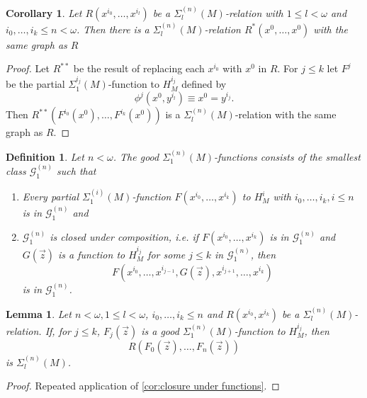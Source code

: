 \documentclass[12pt,a4paper]{article}
\theoremstyle{nicestyle}
\newtheorem{definition}{Definition}[subsection]
\newtheorem{lemma}{Lemma}[subsection]
\newtheorem{corollary}{Corollary}[subsection]
\begin{document}
\begin{corollary}
  Let $R(x^{i_{0}}, \ldots, x^{i_l})$ be a
  $\Sigma^{(n)}_l(M)$-relation with $1 \le l < \omega$ and
  $i_0, \ldots, i_k \le n < \omega$. Then there is a
  $\Sigma^{(n)}_l(M)$-relation $R^{*}(x^{0}, \ldots, x^0)$ with the
  same graph as $R$
\end{corollary}

\begin{proof}
  Let $R^{**}$ be the result of replacing each $x^{i_0}$ with $x^{0}$
  in $R$. For $j \le k$ let $F^j$ be the partial
  $\Sigma^{i_j}_1(M)$-function to $H^{i_j}_{M}$ defined by
  \[
    \phi^{j}(x^{0}, y^{i_{l}}) \equiv x^{0} = y^{i_{j}}.
  \]
  Then $R^{**}(F^{i_{0}}(x^{0}), \ldots, F^{i_{k}}(x^{0}))$ is a
  $\Sigma^{(n)}_l(M)$-relation with the same graph as $R$.
\end{proof}

\begin{definition}
  Let $n < \omega$.  The \emph{good $\Sigma^{(n)}_1(M)$-functions}
  consists of the smallest class $\mathcal{G}^{(n)}_1$ such that
  \begin{enumerate}
  \item Every partial $\Sigma^{(i)}_1(M)$-function
    $F(x^{i_{0}}, \ldots, x^{i_{k}})$ to $H^i_M$ with
    $i_0, \ldots, i_k, i \le n$ is in $\mathcal{G}^{(n)}_{1}$ and
  \item $\mathcal{G}^{(n)}_1$ is closed under composition, i.e. if
    $F(x^{i_{0}}, \ldots, x^{i_k})$ is in $\mathcal{G}^{(n)}_1$ and
    $G(\vec{z})$ is a function to $H^{i_j}_M$ for some $j \le k$ in
    $\mathcal{G}^{(n)}_1$, then
    \[ F(x^{i_{0}}, \ldots, x^{i_{j-1}}, G(\vec{z}), x^{i_{j+1}},
      \ldots, x^{i_{k}})
    \] is in $\mathcal{G}^{(n)}_{1}$.
  \end{enumerate}
\end{definition}

\begin{lemma}
  Let $n < \omega, 1 \le l < \omega$, $i_0, \ldots, i_k \le n$ and
  $R(x^{i_{0}}, x^{i_k})$ be a $\Sigma^{(n)}_l(M)$-relation. If, for
  $j \le k$, $F_j(\vec{z})$ is a good $\Sigma^{(n)}_1(M)$-function to
  $H^{i_j}_M$, then
  \[
    R(F_{0}(\vec{z}), \ldots, F_n(\vec{z}))
  \]
  is $\Sigma^{(n)}_l(M)$.
\end{lemma}

\begin{proof}
  Repeated application of \autoref{cor:closure under functions}.
\end{proof}
\end{document}

